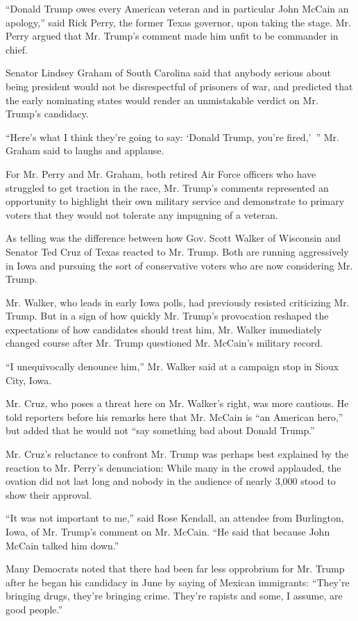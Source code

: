``Donald Trump owes every American veteran and in particular John McCain
an apology,'' said Rick Perry, the former Texas governor, upon taking
the stage. Mr. Perry argued that Mr. Trump's comment made him unfit to
be commander in chief.

Senator Lindsey Graham of South Carolina said that anybody serious about
being president would not be disrespectful of prisoners of war, and
predicted that the early nominating states would render an unmistakable
verdict on Mr. Trump's candidacy.

``Here's what I think they're going to say: `Donald Trump, you're
fired,'~'' Mr. Graham said to laughs and applause.

For Mr. Perry and Mr. Graham, both retired Air Force officers who have
struggled to get traction in the race, Mr. Trump's comments represented
an opportunity to highlight their own military service and demonstrate
to primary voters that they would not tolerate any impugning of a
veteran.

As telling was the difference between how Gov. Scott Walker of Wisconsin
and Senator Ted Cruz of Texas reacted to Mr. Trump. Both are running
aggressively in Iowa and pursuing the sort of conservative voters who
are now considering Mr. Trump.

Mr. Walker, who leads in early Iowa polls, had previously resisted
criticizing Mr. Trump. But in a sign of how quickly Mr. Trump's
provocation reshaped the expectations of how candidates should treat
him, Mr. Walker immediately changed course after Mr. Trump questioned
Mr. McCain's military record.

``I unequivocally denounce him,'' Mr. Walker said at a campaign stop in
Sioux City, Iowa.

Mr. Cruz, who poses a threat here on Mr. Walker's right, was more
cautious. He told reporters before his remarks here that Mr. McCain is
``an American hero,'' but added that he would not ``say something bad
about Donald Trump.''

Mr. Cruz's reluctance to confront Mr. Trump was perhaps best explained
by the reaction to Mr. Perry's denunciation: While many in the crowd
applauded, the ovation did not last long and nobody in the audience of
nearly 3,000 stood to show their approval.

``It was not important to me,'' said Rose Kendall, an attendee from
Burlington, Iowa, of Mr. Trump's comment on Mr. McCain. ``He said that
because John McCain talked him down.''

Many Democrats noted that there had been far less opprobrium for Mr.
Trump after he began his candidacy in June by saying of Mexican
immigrants: ``They're bringing drugs, they're bringing crime. They're
rapists and some, I assume, are good people.''

